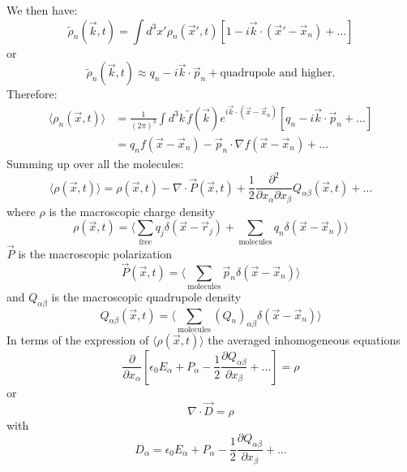 \documentclass{article}
\begin{document}
	
	We then have:
	\begin{equation}
		\tilde{\rho}_n(\vec{k},t) = \int d^3x' \rho_n(\vec{x}',t) [1 - i\vec{k}\cdot(\vec{x}'-\vec{x}_n) + \dots]
	\end{equation}
	or
	\begin{equation}
		\tilde{\rho}_n(\vec{k},t) \approx q_n - i\vec{k}\cdot\vec{p}_n + \text{quadrupole and higher}.
	\end{equation}
	Therefore:
	\begin{align}
		\langle \rho_n(\vec{x},t) \rangle &= \frac{1}{(2\pi)^3} \int d^3k \, \tilde{f}(\vec{k}) e^{i\vec{k}\cdot(\vec{x}-\vec{x}_n)} [q_n - i\vec{k}\cdot\vec{p}_n + \dots] \\
		&= q_n f(\vec{x}-\vec{x}_n) - \vec{p}_n \cdot \nabla f(\vec{x}-\vec{x}_n) + \dots
	\end{align}
	Summing up over all the molecules:
	\begin{equation}
		\langle \rho(\vec{x},t) \rangle = \rho(\vec{x},t) - \nabla \cdot \vec{P}(\vec{x},t) + \frac{1}{2}\frac{\partial^2}{\partial x_\alpha \partial x_\beta} Q_{\alpha\beta}(\vec{x},t) + \dots
	\end{equation}
	where $\rho$ is the macroscopic charge density
	\begin{equation}
		\rho(\vec{x},t) = \langle \sum_{\text{free}} q_j \delta(\vec{x}-\vec{r}_j) + \sum_{\text{molecules}} q_n \delta(\vec{x}-\vec{x}_n) \rangle
	\end{equation}
	$\vec{P}$ is the macroscopic polarization
	\begin{equation}
		\vec{P}(\vec{x},t) = \langle \sum_{\text{molecules}} \vec{p}_n \delta(\vec{x}-\vec{x}_n) \rangle
	\end{equation}
	and $Q_{\alpha\beta}$ is the macroscopic quadrupole density
	\begin{equation}
		Q_{\alpha\beta}(\vec{x},t) = \langle \sum_{\text{molecules}} (Q_n)_{\alpha\beta} \delta(\vec{x}-\vec{x}_n) \rangle
	\end{equation}
	In terms of the expression of $\langle \rho(\vec{x},t) \rangle$ the averaged inhomogeneous equations
	\begin{equation}
		\frac{\partial}{\partial x_\alpha} [\epsilon_0 E_\alpha + P_\alpha - \frac{1}{2} \frac{\partial Q_{\alpha\beta}}{\partial x_\beta} + \dots] = \rho
	\end{equation}
	or
	\begin{equation}
		\nabla \cdot \vec{D} = \rho
	\end{equation}
	with
	\begin{equation}
		D_\alpha = \epsilon_0 E_\alpha + P_\alpha - \frac{1}{2} \frac{\partial Q_{\alpha\beta}}{\partial x_\beta} + \dots
	\end{equation}
	
\end{document}
